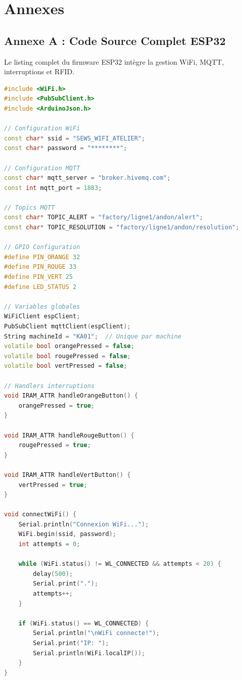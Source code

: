 ﻿%
\chapter{Annexes}

\section{Annexe A : Code Source Complet ESP32}

Le listing complet du firmware ESP32 intègre la gestion WiFi, MQTT, interruptions et RFID.

\begin{lstlisting}[language=C++,caption={Firmware ESP32 complet --- Configuration et setup}]
#include <WiFi.h>
#include <PubSubClient.h>
#include <ArduinoJson.h>

// Configuration WiFi
const char* ssid = "SEWS_WIFI_ATELIER";
const char* password = "********";

// Configuration MQTT
const char* mqtt_server = "broker.hivemq.com";
const int mqtt_port = 1883;

// Topics MQTT
const char* TOPIC_ALERT = "factory/ligne1/andon/alert";
const char* TOPIC_RESOLUTION = "factory/ligne1/andon/resolution";

// GPIO Configuration
#define PIN_ORANGE 32
#define PIN_ROUGE 33
#define PIN_VERT 25
#define LED_STATUS 2

// Variables globales
WiFiClient espClient;
PubSubClient mqttClient(espClient);
String machineId = "KA01";  // Unique par machine
volatile bool orangePressed = false;
volatile bool rougePressed = false;
volatile bool vertPressed = false;

// Handlers interruptions
void IRAM_ATTR handleOrangeButton() {
    orangePressed = true;
}

void IRAM_ATTR handleRougeButton() {
    rougePressed = true;
}

void IRAM_ATTR handleVertButton() {
    vertPressed = true;
}

void connectWiFi() {
    Serial.println("Connexion WiFi...");
    WiFi.begin(ssid, password);
    int attempts = 0;
    
    while (WiFi.status() != WL_CONNECTED && attempts < 20) {
        delay(500);
        Serial.print(".");
        attempts++;
    }
    
    if (WiFi.status() == WL_CONNECTED) {
        Serial.println("\nWiFi connecte!");
        Serial.print("IP: ");
        Serial.println(WiFi.localIP());
    }
}


\end{lstlisting}
